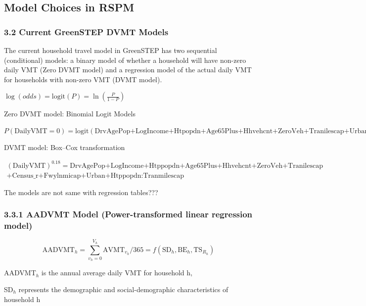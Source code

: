 \documentclass[
]{article}
\begin{document}
\hypertarget{model-choices-in-rspm}{%
\subsection{Model Choices in RSPM}\label{model-choices-in-rspm}}

\hypertarget{current-greenstep-dvmt-models}{%
\subsubsection{3.2 Current GreenSTEP DVMT
Models}\label{current-greenstep-dvmt-models}}

The current household travel model in GreenSTEP has two sequential
(conditional) models: a binary model of whether a household will have
non-zero daily VMT (Zero DVMT model) and a regression model of the
actual daily VMT for households with non-zero VMT (DVMT model).

\(\log(odds)=\mathrm{logit}(P) =\ln\left(\frac{P}{1-P}\right)\)

Zero DVMT model: Binomial Logit Models

\(P(\text{DailyVMT}=0)=\mathrm{logit}(\text{DrvAgePop+LogIncome+Htpopdn+Age65Plus+Hhvehcnt+ZeroVeh+Tranilescap+Urban:Tranmilescap})\)

DVMT model: Box--Cox transformation

\[
\begin{align}
(\text{DailyVMT})^{0.18}=\text{DrvAgePop+LogIncome+Htppopdn+Age65Plus+Hhvehcnt+ZeroVeh+Tranilescap} \\
+\text{Census_r+Fwylnmicap+Urban+Htppopdn:Tranmilescap}
\end{align}
\]

{The models are not same with regression tables???}

\hypertarget{aadvmt-model-power-transformed-linear-regression-model}{%
\subsubsection{3.3.1 AADVMT Model (Power-transformed linear regression
model)}\label{aadvmt-model-power-transformed-linear-regression-model}}

\[\text{AADVMT}_h=\sum_{v_h=0}^{V_h}\text{AVMT}_{v_h}/365=f(\text{SD}_h,\text{BE}_h,\text{TS}_{R_h})\]

AADVMT\(_h\) is the annual average daily VMT for household h,

SD\(_h\) represents the demographic and social-demographic
characteristics of household h
\end{document}

